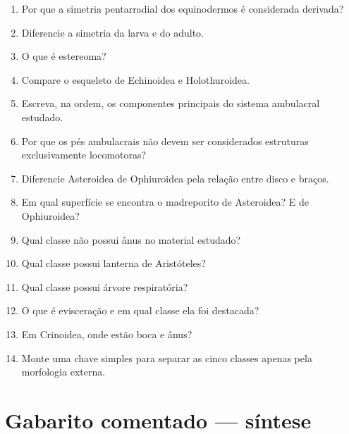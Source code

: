 \documentclass[a4paper,12pt]{article}
\begin{document}
\begin{enumerate}[resume]
  \item Por que a simetria pentarradial dos equinodermos é considerada derivada?
  \item Diferencie a simetria da larva e do adulto.
  \item O que é estereoma?
  \item Compare o esqueleto de Echinoidea e Holothuroidea.
  \item Escreva, na ordem, os componentes principais do sistema ambulacral estudado.
  \item Por que os pés ambulacrais não devem ser considerados estruturas exclusivamente locomotoras?
  \item Diferencie Asteroidea de Ophiuroidea pela relação entre disco e braços.
  \item Em qual superfície se encontra o madreporito de Asteroidea? E de Ophiuroidea?
  \item Qual classe não possui ânus no material estudado?
  \item Qual classe possui lanterna de Aristóteles?
  \item Qual classe possui árvore respiratória?
  \item O que é evisceração e em qual classe ela foi destacada?
  \item Em Crinoidea, onde estão boca e ânus?
  \item Monte uma chave simples para separar as cinco classes apenas pela morfologia externa.
\end{enumerate}

\section{Gabarito comentado — síntese}
\end{document}

